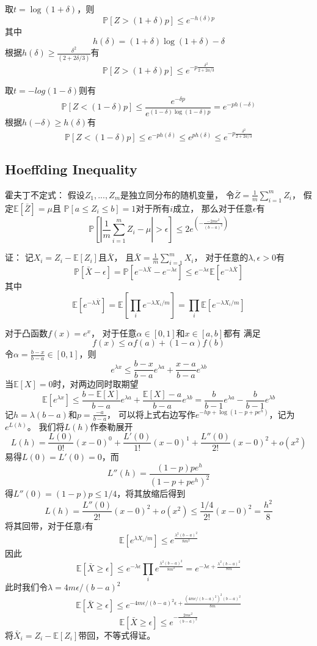 \documentclass[UTF8]{ctexart}
\begin{document}
取$t=\log(1+\delta)$，则
$$
\mathbb{P}[Z>(1+\delta)p]\leq e^{-h(\delta)p}
$$
其中
$$
h(\delta)=(1+\delta)\log(1+\delta)-\delta
$$
根据$h(\delta)\geq \frac{\delta^2}{(2+2\delta/3)}$有
$$
\mathbb{P}[Z>(1+\delta)p]\leq e^{-p\frac{\delta^2}{2+2a/3}}
$$

取$t=-log(1-\delta)$则有
$$
\mathbb{P}[Z<(1-\delta)p]\leq
\frac{e^{-\delta p}}{e^{(1-\delta)\log(1-\delta)p}}=
e^{-ph(-\delta)}
$$
根据$h(-\delta)\geq h(\delta)$有
$$
\mathbb{P}[Z<(1-\delta)p]\leq
e^{-ph(\delta)}\leq e^{ph(\delta)}\leq
e^{-p\frac{\delta^2}{2+2a/3}}
$$


\subsection{Hoeffding Inequality}
霍夫丁不定式：
假设$Z_1,...,Z_m$是独立同分布的随机变量，
令$\overline{Z}=\frac{1}{m}\sum^m_{i=1}Z_i$，
假定$\mathbb{E}[\bar{Z}]=\mu$且
$\mathbb{P}[a\leq Z_i \leq b]=1$对于所有$i$成立，
那么对于任意$\epsilon$有
$$
\mathbb{P}[|\frac{1}{m}\sum^m_{i=1}Z_i-\mu|>\epsilon]\leq
2e^{(-\frac{-2m\epsilon^2}{(b-a)^2})}
$$

证：
记$X_i=Z_i-\mathbb{E}[Z_i]$且$\bar{X}$，
且$\bar{X}=\frac{1}{m}\sum^m_{i=1}X_i$，
对于任意的$\lambda, \epsilon > 0$有
$$
\mathbb{P}[\bar{X}-\epsilon]=
\mathbb{P}[e^{-\lambda\bar{X}}-e^{-\lambda\epsilon}]\leq
e^{-\lambda\epsilon}\mathbb{E}[e^{-\lambda\bar{X}}]
$$
其中
$$
\mathbb{E}[e^{-\lambda\bar{X}}]=
\mathbb{E}[\prod_i e^{-\lambda X_i/m}]=
\prod_i\mathbb{E}[e^{-\lambda X_i/m}]
$$

对于凸函数$f(x)=e^x$，
对于任意$\alpha \in [0,1]$和$x\in[a,b]$都有
满足
$$f(x)\leq \alpha f(a) + (1-\alpha) f(b)
$$
令$\alpha=\frac{b-x}{b-a}\in[0,1]$，则
$$
e^{\lambda x}\leq 
\frac{b-x}{b-a}e^{\lambda a}+\frac{x-a}{b-a}e^{\lambda b}
$$
当$\mathbb{E}[X]=0$时，对两边同时取期望
$$
\mathbb{E}[e^{\lambda x}]\leq
\frac{b-\mathbb{E}[X]}{b-a}e^{\lambda a}+\frac{\mathbb{E}[X]-a}{b-a}e^{\lambda b}=
\frac{b}{b-1}e^{\lambda a} - \frac{b}{b-1}e^{\lambda b} 
$$
记$h=\lambda(b-a)$和$p=\frac{-a}{b-a}$，
可以将上式右边写作$e^{-hp+\log(1-p+pe^h)}$，记为$e^{L(h)}$。
我们将$L(h)$作泰勒展开
$$
L(h)=\frac{L(0)}{0!}(x-0)^0+\frac{L'(0)}{1!}(x-0)^1+\frac{L''(0)}{2!}(x-0)^2+o(x^2)
$$
易得$L(0)=L'(0)=0$，而
$$
L''(h)=\frac{(1-p)pe^h}{(1-p+pe^h)^2}
$$
得$L''(0)=(1-p)p\leq 1/4$，将其放缩后得到
$$
L(h)=\frac{L''(0)}{2!}(x-0)^2+o(x^2)\leq
\frac{1/4}{2!}(x-0)^2=
\frac{h^2}{8}
$$
将其回带，对于任意$i$有
$$
\mathbb{E}[e^{\lambda X_i/m}]\leq e^{\frac{\lambda^2(b-a)^2}{8m^2}}
$$
因此
$$
\mathbb{E}[\bar{X}\geq \epsilon]\leq
e^{-\lambda\epsilon}\prod_ie^{\frac{\lambda^2(b-a)^2}{8m^2}}=
e^{-\lambda\epsilon+\frac{\lambda^2(b-a)^2}{8m}}
$$
此时我们令$\lambda=4m\epsilon/(b-a)^2$
$$
\mathbb{E}[\bar{X}\geq \epsilon]\leq
e^{-4m\epsilon/(b-a)^2\epsilon+\frac{(4m\epsilon/(b-a)^2)^2(b-a)^2}{8m}}
$$
$$
\mathbb{E}[\bar{X}\geq \epsilon]\leq
e^{-\frac{2m\epsilon^2}{(b-a)^2}}
$$
将$\bar{X}_i=Z_i-\mathbb{E}[Z_i]$带回，不等式得证。





%
\end{document}
